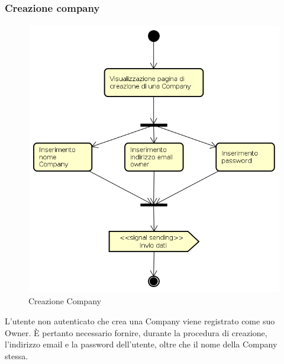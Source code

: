 \subsubsection{Creazione company}
\begin{figure}[H]
\begin{center}
\includegraphics[height=12cm]{res/sections/backend/activities/creazioneCompany.png}
\caption{Creazione Company}
\end{center}
\end{figure}
L'utente non autenticato che crea una Company viene registrato come suo Owner. È pertanto necessario fornire, durante la procedura di creazione, l'indirizzo email e la password dell'utente, oltre che il nome della Company stessa.
\newpage
